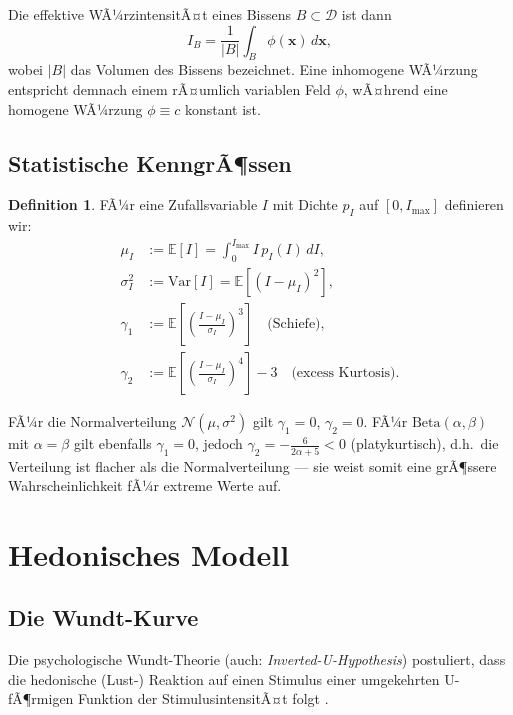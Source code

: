 ﻿\documentclass[12pt,a4paper]{article}
\theoremstyle{definition}
\newtheorem{definition}{Definition}[section]
\newcommand{\E}{\mathbb{E}}
\newcommand{\Var}{\mathrm{Var}}
\newcommand{\N}{\mathcal{N}}
\newcommand{\bx}{\mathbf{x}}
\begin{document}
Die effektive WÃ¼rzintensitÃ¤t eines Bissens $B \subset \mathcal{D}$ ist
dann
\[
  I_B = \frac{1}{|B|} \int_B \phi(\bx)\, d\bx,
\]
wobei $|B|$ das Volumen des Bissens bezeichnet. Eine inhomogene WÃ¼rzung
entspricht demnach einem rÃ¤umlich variablen Feld $\phi$, wÃ¤hrend eine
homogene WÃ¼rzung $\phi \equiv c$ konstant ist.

\subsection{Statistische KenngrÃ¶ssen}

\begin{definition}
FÃ¼r eine Zufallsvariable $I$ mit Dichte $p_I$ auf $[0, I_{\max}]$
definieren wir:
\begin{align}
  \mu_I &:= \E[I] = \int_0^{I_{\max}} I\, p_I(I)\, dI, \\
  \sigma_I^2 &:= \Var[I] = \E[(I - \mu_I)^2], \\
  \gamma_1 &:= \E\!\left[\left(\frac{I-\mu_I}{\sigma_I}\right)^3\right]
             \quad \text{(Schiefe)}, \\
  \gamma_2 &:= \E\!\left[\left(\frac{I-\mu_I}{\sigma_I}\right)^4\right] - 3
             \quad \text{(excess Kurtosis)}.
\end{align}
\end{definition}

FÃ¼r die Normalverteilung $\N(\mu, \sigma^2)$ gilt
$\gamma_1 = 0$, $\gamma_2 = 0$. FÃ¼r $\mathrm{Beta}(\alpha, \beta)$ mit
$\alpha = \beta$ gilt ebenfalls $\gamma_1 = 0$, jedoch
$\gamma_2 = -\tfrac{6}{2\alpha + 5} < 0$ (platykurtisch), d.h.\ die
Verteilung ist flacher als die Normalverteilung --- sie weist somit eine
grÃ¶ssere Wahrscheinlichkeit fÃ¼r extreme Werte auf.

\section{Hedonisches Modell}\label{sec:hedonik}

\subsection{Die Wundt-Kurve}

Die psychologische Wundt-Theorie (auch: \emph{Inverted-U-Hypothesis})
postuliert, dass die hedonische (Lust-) Reaktion auf einen Stimulus
einer umgekehrten U-fÃ¶rmigen Funktion der StimulusintensitÃ¤t folgt
\cite{berlyne1970,wundt1874}.
\end{document}
